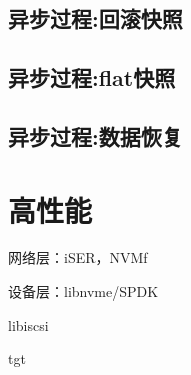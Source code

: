 \subsection{异步过程:回滚快照}

\subsection{异步过程:flat快照}

\subsection{异步过程:数据恢复}

\section{高性能}

网络层：iSER，NVMf

设备层：libnvme/SPDK

libiscsi

tgt
